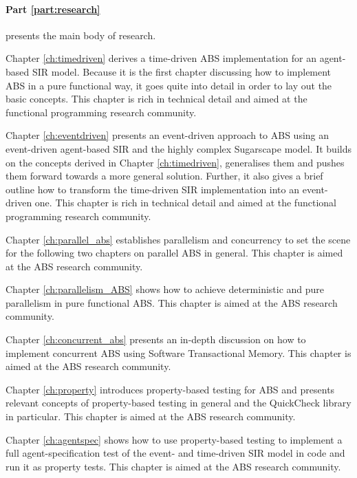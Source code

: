 \medskip

\paragraph{Part \ref{part:research}} presents the main body of research.

\medskip

Chapter \ref{ch:timedriven} derives a time-driven ABS implementation for an agent-based SIR model. Because it is the first chapter discussing how to implement ABS in a pure functional way, it goes quite into detail in order to lay out the basic concepts. This chapter is rich in technical detail and aimed at the functional programming research community.

\medskip

Chapter \ref{ch:eventdriven} presents an event-driven approach to ABS using an event-driven agent-based SIR and the highly complex Sugarscape model. It builds on the concepts derived in Chapter \ref{ch:timedriven}, generalises them and pushes them forward towards a more general solution. Further, it also gives a brief outline how to transform the time-driven SIR implementation into an event-driven one. This chapter is rich in technical detail and aimed at the functional programming research community.

\medskip

Chapter \ref{ch:parallel_abs} establishes parallelism and concurrency to set the scene for the following two chapters on parallel ABS in general. This chapter is aimed at the ABS research community.

\medskip

Chapter \ref{ch:parallelism_ABS} shows how to achieve deterministic and pure parallelism in pure functional ABS. This chapter is aimed at the ABS research community.

\medskip

Chapter \ref{ch:concurrent_abs} presents an in-depth discussion on how to implement concurrent ABS using Software Transactional Memory. This chapter is aimed at the ABS research community.

\medskip

Chapter \ref{ch:property} introduces property-based testing for ABS and presents relevant concepts of property-based testing in general and the QuickCheck library in particular. This chapter is aimed at the ABS research community.

\medskip

Chapter \ref{ch:agentspec} shows how to use property-based testing to implement a full agent-specification test of the event- and time-driven SIR model in code and run it as property tests. This chapter is aimed at the ABS research community.

